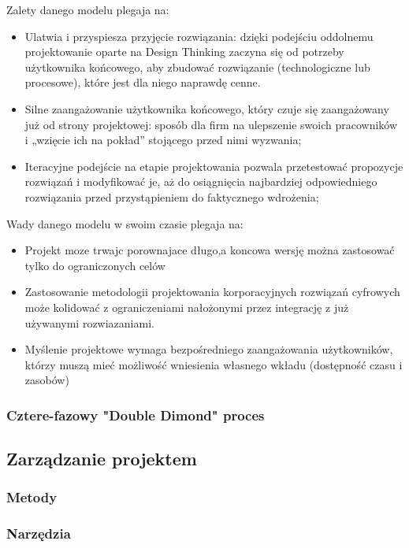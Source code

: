 \documentclass[a4paper,titleauthor]{mwart}
\begin{document}
Zalety danego modelu plegaja na:\newline
\begin{itemize}
\item Ulatwia i przyspiesza przyjęcie rozwiązania: dzięki podejściu oddolnemu projektowanie oparte na Design Thinking zaczyna się od potrzeby użytkownika końcowego, aby zbudować rozwiązanie (technologiczne lub procesowe), które jest dla niego naprawdę cenne.
\item Silne zaangażowanie użytkownika końcowego, który czuje się zaangażowany już od strony projektowej: sposób dla firm na ulepszenie swoich pracowników i „wzięcie ich na pokład” stojącego przed nimi wyzwania;
\item Iteracyjne podejście na etapie projektowania pozwala przetestować propozycje rozwiązań i modyfikować je, aż do osiągnięcia najbardziej odpowiedniego rozwiązania przed przystąpieniem do faktycznego wdrożenia;
\end{itemize}
 Wady danego modelu w swoim czasie plegaja na:\newline
\begin{itemize}
	\item Projekt moze trwajc porownajace długo,a koncowa wersję można zastosować tylko do ograniczonych celów
	\item Zastosowanie metodologii projektowania korporacyjnych rozwiązań cyfrowych może kolidować z ograniczeniami nałożonymi przez integrację z już używanymi rozwiazaniami.
	\item Myślenie projektowe wymaga bezpośredniego zaangażowania użytkowników, którzy muszą mieć możliwość wniesienia własnego wkładu (dostępność czasu i zasobów)
\end{itemize}

 \subsubsection{Cztere-fazowy "Double Dimond" proces}

\subsection{Zarządzanie projektem}
\label{sec:zarządzanie_projektem}

\subsubsection{Metody}
\label{sec:narzędzia}

\subsubsection{Narzędzia}
\label{sec:narzędzia}
\end{document}
